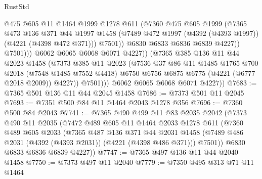 \begin{lexlean}{RustStd}
\begin{coremodule}
                          @475
                          @605
                          @11
                          @1464
                          @1999
                          @1278
                          @611
                          (@7360
                            @475
                            @605
                            @1999
                            (@7365
                              @473
                              @136
                              @371
                              @44
                              @1997
                              @1458
                              (@7489 @472 @1997 (@4392 (@4393 @1997)) (@4221 (@4398 @472 @371)))
                              @7501))
                          @6830
                          @6833
                          @6836
                          @6839
                          @4227))
                      @7501)))
                @6062
                @6065
                @6068
                @6071
                @4227))
            (@7365
              @385
              @136
              @11
              @44
              @2023
              @1458
              (@7373
                @385
                @11
                @2023
                (@7536
                  @37
                  @86
                  @11
                  @1485
                  @1765
                  @700
                  @2018
                  (@7548 @1485 @7552 @4418)
                  @6750
                  @6756
                  @6875
                  @6775
                  (@4221 (@6777 @2018 @2009))
                  @4227))
              @7501)))
        @6062
        @6065
        @6068
        @6071
        @4227))
@7683 := @7365 @501 @136 @11 @44 @2045 @1458
@7686 := @7373 @501 @11 @2045
@7693 := @7351 @500 @84 @11 @1464 @2043 @1278 @356
@7696 := @7360 @500 @84 @2043
@7741 := @7365
    @490
    @499
    @11
    @83
    @2035
    @2042
    (@7373
      @490
      @11
      @2035
      (@7472
        @489
        @605
        @11
        @1464
        @2033
        @1278
        @611
        (@7360
          @489
          @605
          @2033
          (@7365
            @487
            @136
            @371
            @44
            @2031
            @1458
            (@7489 @486 @2031 (@4392 (@4393 @2031)) (@4221 (@4398 @486 @371)))
            @7501))
        @6830
        @6833
        @6836
        @6839
        @4227))
@7747 := @7365 @497 @136 @11 @44 @2040 @1458
@7750 := @7373 @497 @11 @2040
@7779 := @7350
    @495
    @313
    @71
    @11
    @1464

\end{coremodule}
\end{lexlean}
